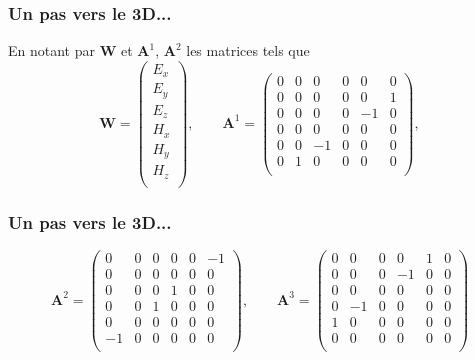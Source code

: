 \documentclass[9pt]{beamer}
\begin{document}
\begin{frame}
\frametitle{Un pas vers le 3D...}
En notant par $\mathbf{W}$ et $\mathbf{A}^1$, $\mathbf{A}^2$ les matrices tels que
\begin{equation}
\mathbf{W}=
\begin{pmatrix}
E_x\\
E_y\\
E_z\\
H_x\\
H_y\\
H_z\\
\end{pmatrix},
\qquad
\mathbf{A}^1=
\begin{pmatrix}
0 & 0 & 0 & 0 & 0 & 0\\
0 & 0 & 0 & 0 & 0 & 1\\
0 & 0 & 0 & 0 & -1 & 0\\
0 & 0 & 0 & 0 & 0 & 0\\
0 & 0 & -1 & 0 & 0 & 0\\
0 & 1 & 0 & 0 & 0 & 0\\
\end{pmatrix},
\end{equation}
\end{frame}


\begin{frame}
\frametitle{Un pas vers le 3D...}
\begin{equation}
\mathbf{A}^2=
\begin{pmatrix}
0 & 0 & 0 & 0 & 0 & -1\\
0 & 0 & 0 & 0 & 0 & 0\\
0 & 0 & 0 & 1 & 0 & 0\\
0 & 0 & 1 & 0 & 0 & 0\\
0 & 0 & 0 & 0 & 0 & 0\\
-1 & 0 & 0 & 0 & 0 & 0\\
\end{pmatrix},
\qquad
\mathbf{A}^3=
\begin{pmatrix}
0 & 0 & 0 & 0 & 1 & 0\\
0 & 0 & 0 & -1 & 0 & 0\\
0 & 0 & 0 & 0 & 0 & 0\\
0 & -1 & 0 & 0 & 0 & 0\\
1 & 0 & 0 & 0 & 0 & 0\\
0 & 0 & 0 & 0 & 0 & 0\\
\end{pmatrix}
\end{equation}
\end{frame}
\end{document}
